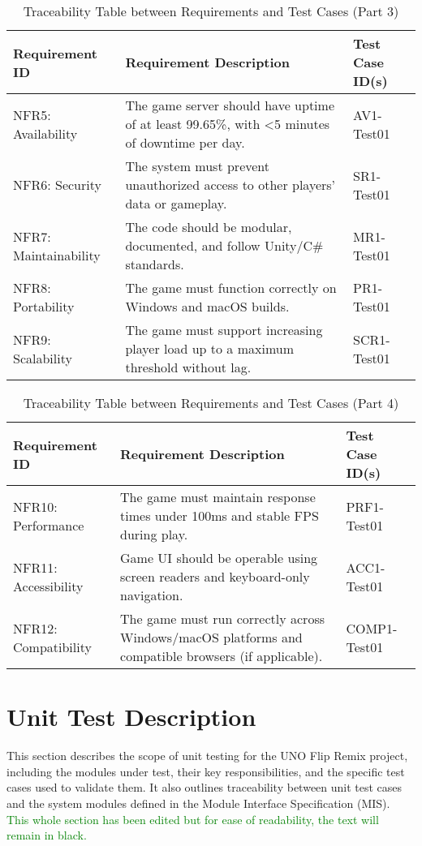 \documentclass[12pt]{article}
\newcommand{\added}[1]{\textcolor{green}{#1}}
\begin{document}
\begin{table}[H]
\centering
\begin{tabularx}{\textwidth}{|l|X|X|}
\hline
\textbf{Requirement ID} & \textbf{Requirement Description} & \textbf{Test Case ID(s)} \\ \hline
NFR5: Availability & The game server should have uptime of at least 99.65\%, with <5 minutes of downtime per day. & AV1-Test01 \\ \hline
NFR6: Security & The system must prevent unauthorized access to other players’ data or gameplay. & SR1-Test01 \\ \hline
NFR7: Maintainability & The code should be modular, documented, and follow Unity/C\# standards. & MR1-Test01 \\ \hline
NFR8: Portability & The game must function correctly on Windows and macOS builds. & PR1-Test01 \\ \hline
NFR9: Scalability & The game must support increasing player load up to a maximum threshold without lag. & SCR1-Test01 \\ \hline
\end{tabularx}
\caption{Traceability Table between Requirements and Test Cases (Part 3)}
\end{table}

\begin{table}[H]
\centering
\begin{tabularx}{\textwidth}{|l|X|X|}
\hline
\textbf{Requirement ID} & \textbf{Requirement Description} & \textbf{Test Case ID(s)} \\ \hline
NFR10: Performance & The game must maintain response times under 100ms and stable FPS during play. & PRF1-Test01 \\ \hline
NFR11: Accessibility & Game UI should be operable using screen readers and keyboard-only navigation. & ACC1-Test01 \\ \hline
NFR12: Compatibility & The game must run correctly across Windows/macOS platforms and compatible browsers (if applicable). & COMP1-Test01 \\ \hline
\end{tabularx}
\caption{Traceability Table between Requirements and Test Cases (Part 4)}
\end{table}

\section{Unit Test Description}

This section describes the scope of unit testing for the UNO Flip Remix project, including the modules under test, their key responsibilities, and the specific test cases used to validate them. It also outlines traceability between unit test cases and the system modules defined in the Module Interface Specification (MIS). \added{This whole section has been edited but for ease of readability, the text will remain in black.}
\end{document}
